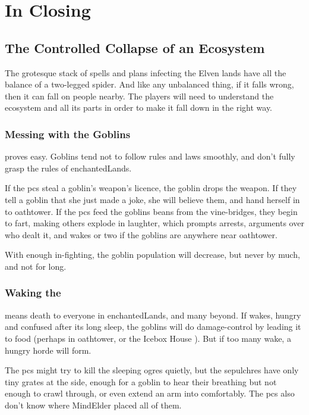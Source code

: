 \section{In Closing}
\label{feyClosing}

\begin{multicols}{2}

\subsection{The Controlled Collapse of an Ecosystem}

The grotesque stack of \glspl{spell} and plans infecting the Elven lands have all the balance of a two-legged spider.
And like any unbalanced thing, if it falls wrong, then it can fall on people nearby.
The players will need to understand the ecosystem and all its parts in order to make it fall down in the right way.

\subsubsection{Messing with the Goblins}
proves easy.
Goblins tend not to follow rules and laws smoothly,%
and don't fully grasp the rules of \gls{enchantedLands}.

If the \glspl{pc} steal a goblin's weapon's licence, the goblin drops the weapon.
If they tell a goblin that she just made a joke, she will believe them, and hand herself in to \gls{oathtower}.
If the \glspl{pc} feed the goblins beans from the vine-bridges,
they begin to fart, making others explode in laughter, which prompts arrests, arguments over who dealt it, and wakes  or two if the goblins are anywhere near \gls{oathtower}.

With enough in-fighting, the goblin population will decrease, but never by much, and not for long.

\subsubsection{Waking the }
means death to everyone in \gls{enchantedLands}, and many beyond.
If  wakes, hungry and confused after its long sleep, the goblins will do damage-control by leading it to food (perhaps in \gls{oathtower}, or the Icebox House ).
But if too many wake, a hungry horde will form.

The \glspl{pc} might try to kill the sleeping \glspl{ogre} quietly, but the sepulchres have only tiny grates at the side, enough for a goblin to hear their breathing but not enough to crawl through, or even extend an arm into comfortably.
The \glspl{pc} also don't know where \gls{MindElder} placed all of them.


\end{multicols}
